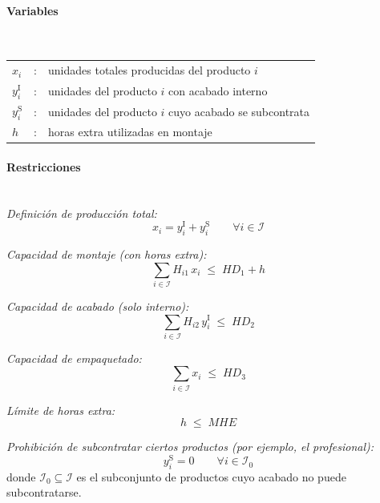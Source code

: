 \paragraph{Variables}\mbox{}\\
\begin{tabular}{lcl}
$x_i$ & : & unidades totales producidas del producto $i$ \\
$y_i^{\mathrm{I}}$ & : & unidades del producto $i$ con acabado interno \\
$y_i^{\mathrm{S}}$ & : & unidades del producto $i$ cuyo acabado se subcontrata \\
$h$ & : & horas extra utilizadas en montaje \\
\end{tabular}

\paragraph{Restricciones}\mbox{}\\

\textit{Definición de producción total:}
\begin{equation}
x_i = y_i^{\mathrm{I}} + y_i^{\mathrm{S}} \qquad \forall i \in \mathcal{I}
\end{equation}

\textit{Capacidad de montaje (con horas extra):}
\begin{equation}
\sum_{i \in \mathcal{I}} H_{i1}\,x_i \;\leq\; HD_1 + h
\end{equation}

\textit{Capacidad de acabado (solo interno):}
\begin{equation}
\sum_{i \in \mathcal{I}} H_{i2}\,y_i^{\mathrm{I}} \;\leq\; HD_2
\end{equation}

\textit{Capacidad de empaquetado:}
\begin{equation}
\sum_{i \in \mathcal{I}} x_i \;\leq\; HD_3
\end{equation}

\textit{Límite de horas extra:}
\begin{equation}
h \;\leq\; MHE
\end{equation}

\textit{Prohibición de subcontratar ciertos productos (por ejemplo, el profesional):}
\begin{equation}
y_i^{\mathrm{S}} = 0 \qquad \forall i \in \mathcal{I}_0
\end{equation}
donde $\mathcal{I}_0 \subseteq \mathcal{I}$ es el subconjunto de productos cuyo acabado no puede subcontratarse.

